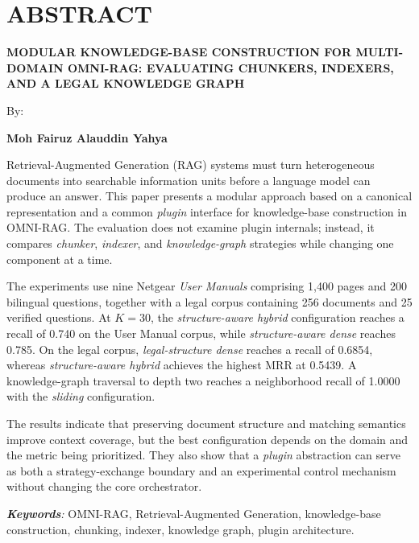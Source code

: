 \clearpage
\chapter*{ABSTRACT}

\begin{center}
    \begin{singlespace}
        {\large\bfseries MODULAR KNOWLEDGE-BASE CONSTRUCTION FOR MULTI-DOMAIN OMNI-RAG: EVALUATING CHUNKERS, INDEXERS, AND A LEGAL KNOWLEDGE GRAPH}

        {\normalfont\normalsize By:}

        {\bfseries Moh Fairuz Alauddin Yahya}
    \end{singlespace}
\end{center}

\begin{singlespace}
    \small

    Retrieval-Augmented Generation (RAG) systems must turn heterogeneous documents into searchable information units before a language model can produce an answer. This paper presents a modular approach based on a canonical representation and a common \emph{plugin} interface for knowledge-base construction in OMNI-RAG. The evaluation does not examine plugin internals; instead, it compares \emph{chunker}, \emph{indexer}, and \emph{knowledge-graph} strategies while changing one component at a time.

    The experiments use nine Netgear \emph{User Manuals} comprising 1,400 pages and 200 bilingual questions, together with a legal corpus containing 256 documents and 25 verified questions. At $K=30$, the \emph{structure-aware hybrid} configuration reaches a recall of 0.740 on the User Manual corpus, while \emph{structure-aware dense} reaches 0.785. On the legal corpus, \emph{legal-structure dense} reaches a recall of 0.6854, whereas \emph{structure-aware hybrid} achieves the highest MRR at 0.5439. A knowledge-graph traversal to depth two reaches a neighborhood recall of 1.0000 with the \emph{sliding} configuration.

    The results indicate that preserving document structure and matching semantics improve context coverage, but the best configuration depends on the domain and the metric being prioritized. They also show that a \emph{plugin} abstraction can serve as both a strategy-exchange boundary and an experimental control mechanism without changing the core orchestrator.

    \textit{\textbf{Keywords}:} OMNI-RAG, Retrieval-Augmented Generation, knowledge-base construction, chunking, indexer, knowledge graph, plugin architecture.
\end{singlespace}

\clearpage

